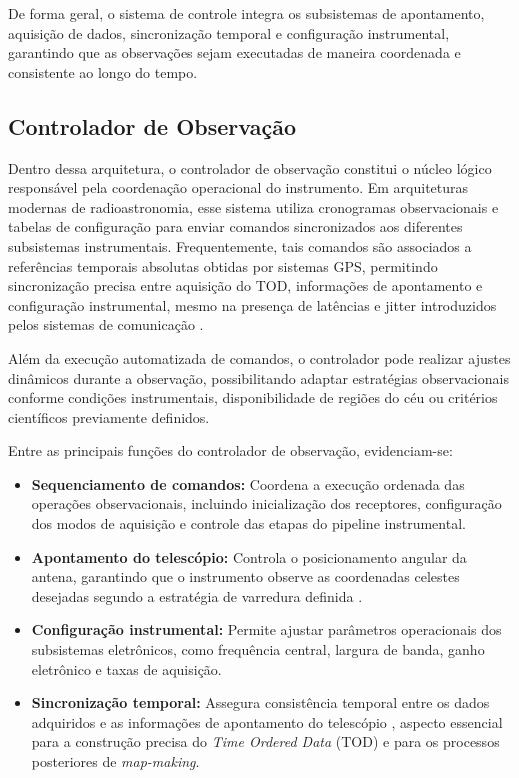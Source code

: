 De forma geral, o sistema de controle integra os subsistemas de apontamento, aquisição de dados, sincronização temporal e configuração instrumental, garantindo que as observações sejam executadas de maneira coordenada e consistente ao longo do tempo.

\subsection{Controlador de Observação}

Dentro dessa arquitetura, o controlador de observação constitui o núcleo lógico responsável pela coordenação operacional do instrumento. Em arquiteturas modernas de radioastronomia, esse sistema utiliza cronogramas observacionais e tabelas de configuração para enviar comandos sincronizados aos diferentes subsistemas instrumentais. Frequentemente, tais comandos são associados a referências temporais absolutas obtidas por sistemas GPS, permitindo sincronização precisa entre aquisição do TOD, informações de apontamento e configuração instrumental, mesmo na presença de latências e jitter introduzidos pelos sistemas de comunicação \cite{tingay2013mwa}.

Além da execução automatizada de comandos, o controlador pode realizar ajustes dinâmicos durante a observação, possibilitando adaptar estratégias observacionais conforme condições instrumentais, disponibilidade de regiões do céu ou critérios científicos previamente definidos.

Entre as principais funções do controlador de observação, evidenciam-se:

\begin{itemize}
    \item \textbf{Sequenciamento de comandos:} Coordena a execução ordenada das operações observacionais, incluindo inicialização dos receptores, configuração dos modos de aquisição e controle das etapas do pipeline instrumental.

    \item \textbf{Apontamento do telescópio:} Controla o posicionamento angular da antena, garantindo que o instrumento observe as coordenadas celestes desejadas segundo a estratégia de varredura definida \cite{wilson2013tools}.

    \item \textbf{Configuração instrumental:} Permite ajustar parâmetros operacionais dos subsistemas eletrônicos, como frequência central, largura de banda, ganho eletrônico e taxas de aquisição.

    \item \textbf{Sincronização temporal:} Assegura consistência temporal entre os dados adquiridos e as informações de apontamento do telescópio \cite{tingay2013mwa}, aspecto essencial para a construção precisa do \textit{Time Ordered Data} (TOD) e para os processos posteriores de \textit{map-making}.
\end{itemize}

